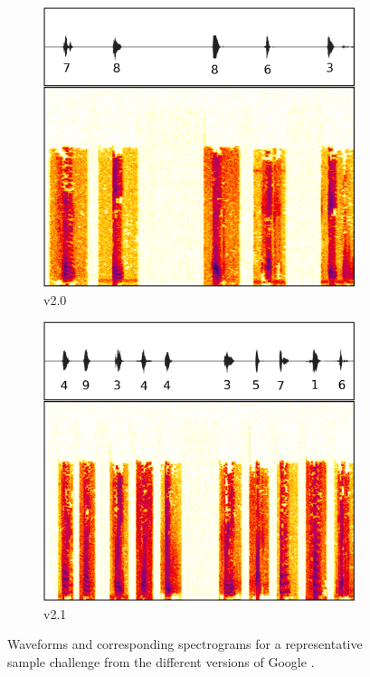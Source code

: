 \begin{figure}[tp]
\begin{subfigure}{0.23\textwidth}
        \includegraphics[width=\textwidth]{figures/recaptcha2a.pdf}
        \caption{\re v2.0}
        \label{fig:recaptcha2a}
\end{subfigure}\hspace{0.01\textwidth}
\begin{subfigure}{0.23\textwidth}
        \includegraphics[width=\textwidth]{figures/recaptcha2b.pdf}
        \caption{\re v2.1}
        \label{fig:recaptcha2b}
\end{subfigure}
\caption{Waveforms and corresponding spectrograms for a representative sample challenge from the different versions of Google \re.}
\label{fig:examples}
\end{figure}


